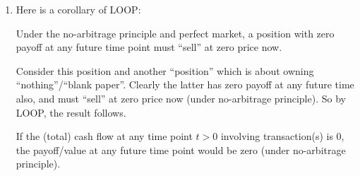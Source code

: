 \begin{enumerate}
\item Here is a corollary of LOOP:
\begin{corollary}
\label{cor:zero-payoff-zero-price}
Under the no-arbitrage principle and perfect market, a position 
with zero payoff at any future time point must ``sell'' at zero price now.
\end{corollary}
\begin{pf}
Consider this position  and another ``position'' which is about
owning ``nothing''/``blank paper''. Clearly the latter has zero payoff at any
future time also, and must ``sell'' at zero price now (under no-arbitrage
principle).  So by LOOP, the result follows.
\end{pf}

\begin{note}
If the (total) cash flow at any time point \(t>0\) involving transaction(s) is
0, the payoff/value at any future time point would be zero (under no-arbitrage
principle).
\end{note}
\end{enumerate}
